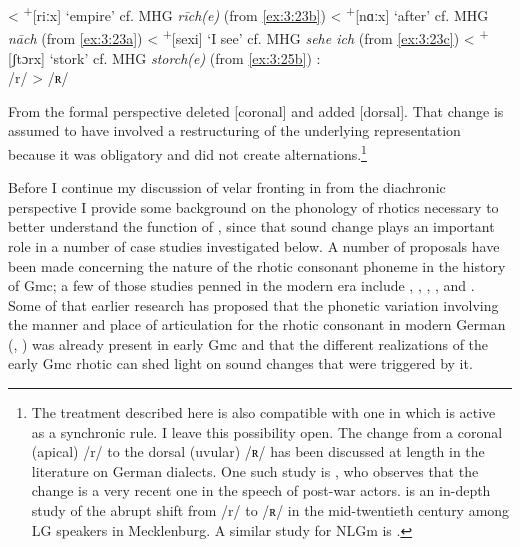 \ea%
\TabPositions{1.5cm, 1.8cm, 2cm, 3.5cm, 5cm, 8cm}
\label{ex:3:28}
\ea\label{ex:3:28a} \relax [ʀɑiҫ]   \tab  <  \tab \textsuperscript{+}[riːx]  \tab ‘empire’ \tab  cf. MHG \textit{rīch(e)}   \tab (from \ref{ex:3:23b})
\ex\label{ex:3:28b} \relax [nəx]    \tab  <  \tab \textsuperscript{+}[nɑːx]  \tab ‘after’  \tab  cf. MHG \textit{nāch}      \tab (from \ref{ex:3:23a})
\ex\label{ex:3:28c} \relax [seəxi]  \tab  <  \tab \textsuperscript{+}[sexi]  \tab ‘I see’  \tab  cf. MHG \textit{sehe ich}  \tab (from \ref{ex:3:23c})
\ex\label{ex:3:28d} \relax [ʃtɔɐx]  \tab  <  \tab \textsuperscript{+}[ʃtɔrx] \tab ‘stork’  \tab  cf. MHG \textit{storch(e)} \tab (from \ref{ex:3:25b})
\z 
\ex%
    :\label{ex:3:29}\\
    /r/ >  /ʀ/
\z 

From the formal perspective  deleted [coronal] and added [dorsal]. That change is assumed to have involved a restructuring of the underlying representation because it was obligatory and did not create alternations.\footnote{The treatment described here is also compatible with one in which  is active as a synchronic rule. I leave this possibility open. The change from a coronal (apical) /r/ to the dorsal (uvular) /ʀ/ has been discussed at length in the literature on German dialects. One such study is \citet[29]{Wiese2003}, who observes that the change is a very recent one in the speech of post-war actors. \citet{Ehlers2021} is an in-depth study of the abrupt shift from /r/ to /ʀ/ in the mid-twentieth century among LG speakers in Mecklenburg. A similar study for NLGm is \citet[32-33]{Wilcken2013}.}

Before I continue my discussion of velar fronting in  from the diachronic perspective I provide some background on the phonology of rhotics necessary to better understand the function of , since that sound change plays an important role in a number of case studies investigated below. A number of proposals have been made concerning the nature of the rhotic consonant phoneme in the history of Gmc; a few of those studies penned in the modern era include \citet{Runge1973}, \citet{Howell1991}, \citet{KingBeach1998}, \citet{Denton2003}, and \citet{Kostakis2015}. Some of that earlier research has proposed that the phonetic variation involving the manner and place of articulation for the rhotic consonant in modern German (\citealt{Kohler1977}, \citealt{Hall1993}) was already present in early Gmc and that the different realizations of the early Gmc rhotic can shed light on sound changes that were triggered by it.

